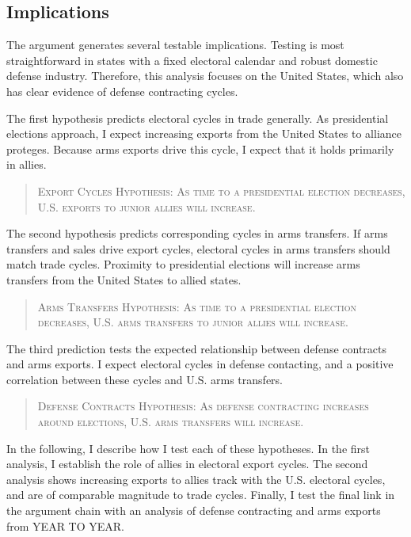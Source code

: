 \documentclass[12pt]{article}
\begin{document}
\subsection{Implications}



The argument generates several testable implications. 
Testing is most straightforward in states with a fixed electoral calendar and robust domestic defense industry. 
Therefore, this analysis focuses on the United States, which also has clear evidence of defense contracting cycles.


The first hypothesis predicts electoral cycles in trade generally. 
As presidential elections approach, I expect increasing exports from the United States to alliance proteges.
Because arms exports drive this cycle, I expect that it holds primarily in allies.


\begin{quote}
\textsc{Export Cycles Hypothesis: As time to a presidential election decreases, U.S. exports to junior allies will increase.}
\end{quote}



The second hypothesis predicts corresponding cycles in arms transfers.
If arms transfers and sales drive export cycles, electoral cycles in arms transfers should match trade cycles.
Proximity to presidential elections will increase arms transfers from the United States to allied states. 


\begin{quote}
\textsc{Arms Transfers Hypothesis: As time to a presidential election decreases, U.S. arms transfers to junior allies will increase.}
\end{quote}


The third prediction tests the expected relationship between defense contracts and arms exports. 
I expect electoral cycles in defense contacting, and a positive correlation between these cycles and U.S. arms transfers.


\begin{quote}
\textsc{Defense Contracts Hypothesis: As defense contracting increases around elections, U.S. arms transfers will increase.}
\end{quote}



In the following, I describe how I test each of these hypotheses. 
In the first analysis, I establish the role of allies in electoral export cycles. 
The second analysis shows increasing exports to allies track with the U.S. electoral cycles, and are of comparable magnitude to trade cycles.
Finally, I test the final link in the argument chain with an analysis of defense contracting and arms exports from YEAR TO YEAR.
\end{document}
